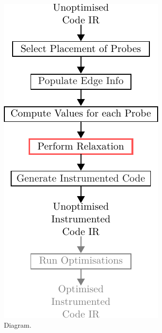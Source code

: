 \begin{figure}[h]
  \centering
  \includegraphics[scale=0.9]{figs/relax-instr-diagram.pdf}
  \caption{Diagram.}
  \label{fig:relax-instr-diagram}
\end{figure}




